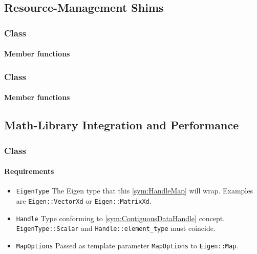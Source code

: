 \subsection{Resource-Management Shims}

\subsubsection[Class Allocator]{Class }

\paragraph{Member functions}

\subsubsection[Class NativeRandomNumberGenerator]{Class }

\paragraph{Member functions}


\subsection{Math-Library Integration and Performance}

\subsubsection[Class HandleMap]{Class }

\paragraph{Requirements}

\begin{itemize}
	\item \texttt{EigenType} The Eigen type that this \ref{sym:HandleMap} will wrap. Examples are \texttt{Eigen::VectorXd} or \texttt{Eigen::MatrixXd}.
	\item \texttt{Handle} Type conforming to \ref{sym:ContiguousDataHandle} concept. \texttt{EigenType::Scalar} and \texttt{Handle::element\_type} must coincide.
	\item \texttt{MapOptions} Passed as template parameter \texttt{MapOptions} to \texttt{Eigen::Map}.
\end{itemize}

